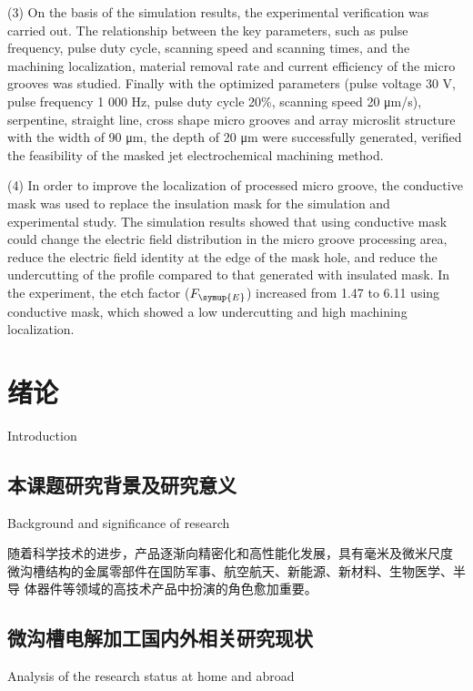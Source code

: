 \documentclass[
  type=doctor
]{../gdutthesis}
\begin{document}
\begin{abstract*}
  (3) On the basis of the simulation results, the experimental verification was carried out.
  The relationship between the key parameters, such as pulse frequency, pulse duty cycle,
  scanning speed and scanning times, and the machining localization, material removal rate
  and current efficiency of the micro grooves was studied. Finally with the optimized
  parameters (pulse voltage 30 V, pulse frequency 1 000 Hz, pulse duty cycle 20\%, scanning
  speed 20 μm/s), serpentine, straight line, cross shape micro grooves and array microslit
  structure with the width of 90 μm, the depth of 20 μm were successfully generated, verified
  the feasibility of the masked jet electrochemical machining method.

  (4) In order to improve the localization of processed micro groove, the conductive mask
  was used to replace the insulation mask for the simulation and experimental study. The
  simulation results showed that using conductive mask could change the electric field
  distribution in the micro groove processing area, reduce the electric field identity at the edge
  of the mask hole, and reduce the undercutting of the profile compared to that generated with
  insulated mask. In the experiment, the etch factor ($F_{\symup{E}}$) increased from 1.47 to 6.11 using
  conductive mask, which showed a low undercutting and high machining localization.
\end{abstract*}

\gduttableofcontents

\mainmatter

\chapter{绪论}{Introduction}

\section{本课题研究背景及研究意义}{Background and significance of research}

随着科学技术的进步，产品逐渐向精密化和高性能化发展，具有毫米及微米尺度
微沟槽结构的金属零部件在国防军事、航空航天、新能源、新材料、生物医学、半导
体器件等领域的高技术产品中扮演的角色愈加重要。

\section{微沟槽电解加工国内外相关研究现状}{Analysis of the research status at home and abroad}
\end{document}
